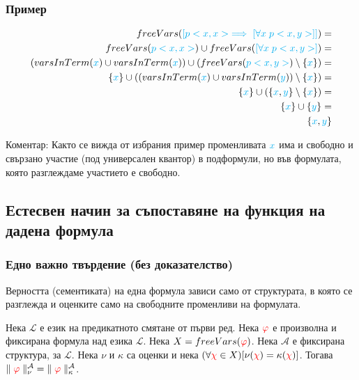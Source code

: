\documentclass{article}[12pt]
\newcommand{\Lang}{\mathcal{L}}
\begin{document}
\subsubsection{Пример}

\begin{align*}
freeVars(\color{cyan} [p<x, x> \implies [\forall x \; p<x, y>] ] \color{black}) = \\
freeVars(\color{cyan} p<x, x> \color{black}) \cup freeVars(\color{cyan} [\forall x \; p<x, y>] \color{black}) = \\
(varsInTerm(\color{cyan} x \color{black}) \cup varsInTerm(\color{cyan} x \color{black})) \cup (freeVars(\color{cyan} p<x, y> \color{black}) \setminus \{\color{cyan} x \color{black}\}) = \\
\{\color{cyan} x \color{black}\} \cup ((varsInTerm(\color{cyan} x \color{black}) \cup varsInTerm(\color{cyan} y \color{black})) \setminus \{\color{cyan} x \color{black}\}) = \\
\{\color{cyan} x \color{black}\} \cup (\{\color{cyan} x \color{black}, \color{cyan} y \color{black}\} \setminus \{\color{cyan} x \color{black}\}) = \\
\{\color{cyan} x \color{black}\} \cup \{\color{cyan} y \color{black}\} = \\
\{\color{cyan} x \color{black}, \color{cyan} y \color{black}\}
\end{align*}

Коментар: Както се вижда от избрания пример променливата \(\color{cyan} x\) има и свободно и свързано участие (под универсален квантор) в подформули,
но във формулата, която разглеждаме участието е свободно.

\subsection{Естесвен начин за съпоставяне на функция на дадена формула}

\subsubsection{Едно важно твърдение (без доказателство)}

Верността (сементиката) на една формула зависи само от структурата, в която се разглежда и оценките само на свободните променливи на формулата.

\vspace{1cm}

Нека \(\Lang\) е език на предикатното смятане от първи ред.
Нека \(\color{red} \varphi\) е произволна и фиксирана формула над езика \(\Lang\). Нека \(X = freeVars(\color{red} \varphi \color{black})\).
Нека \(\mathcal{A}\) е фиксирана структура, за \(\Lang\). Нека \(\nu\) и \(\kappa\) са оценки и нека \((\forall \color{red} \chi \color{black} \in X)[\nu(\color{red} \chi \color{black}) = \kappa(\color{red} \chi \color{black})]\).
Тогава \(\| \; \color{red} \varphi \color{black} \; \|^{\mathcal{A}}_{\nu} = \| \; \color{red} \varphi \color{black} \; \|^{\mathcal{A}}_{\kappa}\).
\end{document}
